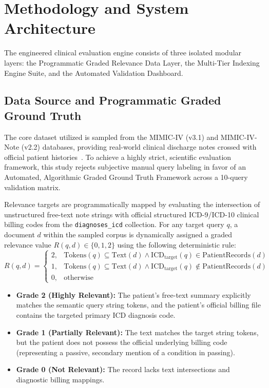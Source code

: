 \documentclass[conference]{IEEEtran}
\begin{document}
\section{Methodology and System Architecture}
The engineered clinical evaluation engine consists of three isolated modular layers: the Programmatic Graded Relevance Data Layer, the Multi-Tier Indexing Engine Suite, and the Automated Validation Dashboard.

\subsection{Data Source and Programmatic Graded Ground Truth}
The core dataset utilized is sampled from the MIMIC-IV (v3.1) and MIMIC-IV-Note (v2.2) databases, providing real-world clinical discharge notes crossed with official patient histories~\cite{johnson2023mimic}. To achieve a highly strict, scientific evaluation framework, this study rejects subjective manual query labeling in favor of an Automated, Algorithmic Graded Ground Truth Framework across a 10-query validation matrix.

Relevance targets are programmatically mapped by evaluating the intersection of unstructured free-text note strings with official structured ICD-9/ICD-10 clinical billing codes from the \texttt{diagnoses\_icd} collection. For any target query $q$, a document $d$ within the sampled corpus is dynamically assigned a graded relevance value $R(q, d) \in \{0, 1, 2\}$ using the following deterministic rule:
\begin{equation}
R(q, d) =
\begin{cases}
2, & \mathrm{Tokens}(q) \subseteq \mathrm{Text}(d) \land \mathrm{ICD}_{\mathrm{target}}(q) \in \mathrm{PatientRecords}(d) \\
1, & \mathrm{Tokens}(q) \subseteq \mathrm{Text}(d) \land \mathrm{ICD}_{\mathrm{target}}(q) \notin \mathrm{PatientRecords}(d) \\
0, & \mathrm{otherwise}
\end{cases}
\end{equation}

\begin{itemize}
    \item \textbf{Grade 2 (Highly Relevant):} The patient's free-text summary explicitly matches the semantic query string tokens, and the patient's official billing file contains the targeted primary ICD diagnosis code.
    \item \textbf{Grade 1 (Partially Relevant):} The text matches the target string tokens, but the patient does not possess the official underlying billing code (representing a passive, secondary mention of a condition in passing).
    \item \textbf{Grade 0 (Not Relevant):} The record lacks text intersections and diagnostic billing mappings.
\end{itemize}
\end{document}
